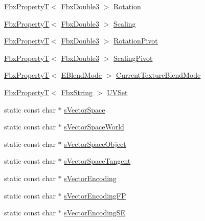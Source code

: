 \begin{DoxyCompactItemize}
\item 
\hyperlink{class_fbx_property_t}{Fbx\+PropertyT}$<$ \hyperlink{fbxtypes_8h_ae0a96f14cde566774c7553aa7523b7a7}{Fbx\+Double3} $>$ \hyperlink{class_fbx_texture_a299b7759e086a905185a2dabe8a5b510}{Rotation}
\item 
\hyperlink{class_fbx_property_t}{Fbx\+PropertyT}$<$ \hyperlink{fbxtypes_8h_ae0a96f14cde566774c7553aa7523b7a7}{Fbx\+Double3} $>$ \hyperlink{class_fbx_texture_a0fb4219993fe8b6fcad89b62d22d2489}{Scaling}
\item 
\hyperlink{class_fbx_property_t}{Fbx\+PropertyT}$<$ \hyperlink{fbxtypes_8h_ae0a96f14cde566774c7553aa7523b7a7}{Fbx\+Double3} $>$ \hyperlink{class_fbx_texture_ae3f8835e136b889fbcd6b388c452310e}{Rotation\+Pivot}
\item 
\hyperlink{class_fbx_property_t}{Fbx\+PropertyT}$<$ \hyperlink{fbxtypes_8h_ae0a96f14cde566774c7553aa7523b7a7}{Fbx\+Double3} $>$ \hyperlink{class_fbx_texture_acf9aad8b79662d0cd8f3d336d0414dee}{Scaling\+Pivot}
\item 
\hyperlink{class_fbx_property_t}{Fbx\+PropertyT}$<$ \hyperlink{class_fbx_texture_af1e8597086589ba6b8ba0066d47b6b63}{E\+Blend\+Mode} $>$ \hyperlink{class_fbx_texture_a0f0cad13b8b10cfbeb31801b503a60ec}{Current\+Texture\+Blend\+Mode}
\item 
\hyperlink{class_fbx_property_t}{Fbx\+PropertyT}$<$ \hyperlink{class_fbx_string}{Fbx\+String} $>$ \hyperlink{class_fbx_texture_ae28f2e1c33fa74ab1e9752f9de0be552}{U\+V\+Set}
\item 
static const char $\ast$ \hyperlink{class_fbx_texture_a496d2263bd3423ed99633852d396a50f}{s\+Vector\+Space}
\item 
static const char $\ast$ \hyperlink{class_fbx_texture_a0811135bfb05bae900c5100c5597af52}{s\+Vector\+Space\+World}
\item 
static const char $\ast$ \hyperlink{class_fbx_texture_a4630b513879dd7403cd51fe0efaeb5ca}{s\+Vector\+Space\+Object}
\item 
static const char $\ast$ \hyperlink{class_fbx_texture_a606da961541df60244581084fcba2198}{s\+Vector\+Space\+Tangent}
\item 
static const char $\ast$ \hyperlink{class_fbx_texture_ae8aca07710aa872fa8964408101f8a5b}{s\+Vector\+Encoding}
\item 
static const char $\ast$ \hyperlink{class_fbx_texture_a5cd9b07db0e8ee5792511c50626f442b}{s\+Vector\+Encoding\+FP}
\item 
static const char $\ast$ \hyperlink{class_fbx_texture_a4f12c4756b837abd121c25662bd61009}{s\+Vector\+Encoding\+SE}

\end{DoxyCompactItemize}

